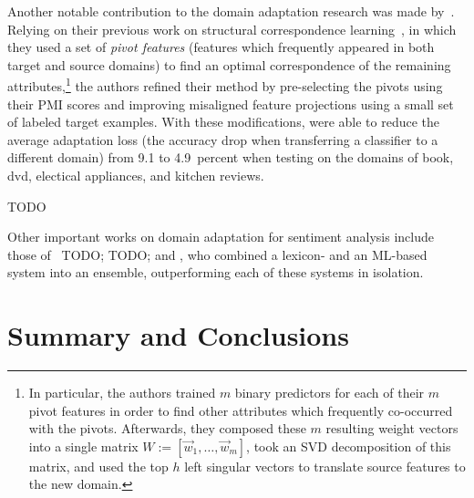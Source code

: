Another notable contribution to the domain adaptation research was
made by~\citet{Blitzer:07}.  Relying on their previous work on
structural correspondence learning~\cite{Blitzer:07}, in which they
used a set of \emph{pivot features} (features which frequently
appeared in both target and source domains) to find an optimal
correspondence of the remaining attributes,\footnote{In particular,
  the authors trained $m$ binary predictors for each of their $m$
  pivot features in order to find other attributes which frequently
  co-occurred with the pivots.  Afterwards, they composed these $m$
  resulting weight vectors into a single matrix
  $W := [\vec{w}_{1},\ldots,\vec{w}_{m}]$, took an SVD decomposition
  of this matrix, and used the top $h$ left singular vectors to
  translate source features to the new domain.} the authors refined
their method by pre-selecting the pivots using their PMI scores and
improving misaligned feature projections using a small set of labeled
target examples.  With these modifications, \citeauthor{Blitzer:07}
were able to reduce the average adaptation loss (the accuracy drop
when transferring a classifier to a different domain) from 9.1 to
4.9~percent when testing on the domains of book, dvd, electical
appliances, and kitchen reviews.

\citet{Yang:15} TODO

Other important works on domain adaptation for sentiment analysis
include those of~\citet{Read:05} TODO; \citet{Tan:07} TODO; and
\citet{Andreevskaia:08}, who combined a lexicon- and an ML-based
system into an ensemble, outperforming each of these systems in
isolation.

\section{Summary and Conclusions}\label{slsa:subsec:conclusions}
